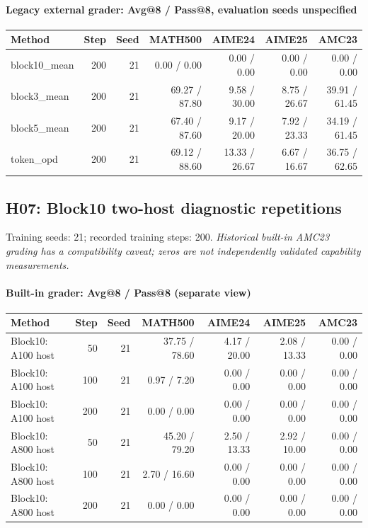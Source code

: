 \paragraph{Legacy external grader: Avg@8 / Pass@8, evaluation seeds unspecified}
{\footnotesize\setlength{\tabcolsep}{3.5pt}
\begin{longtable}{@{}p{1.4in}rrrrrr@{}}
\toprule
Method & Step & Seed & MATH500 & AIME24 & AIME25 & AMC23 \\
\midrule\endhead
block10\_\allowbreak{}mean & 200 & 21 & 0.00 / 0.00 & 0.00 / 0.00 & 0.00 / 0.00 & 0.00 / 0.00 \\
block3\_\allowbreak{}mean & 200 & 21 & 69.27 / 87.80 & 9.58 / 30.00 & 8.75 / 26.67 & 39.91 / 61.45 \\
block5\_\allowbreak{}mean & 200 & 21 & 67.40 / 87.60 & 9.17 / 20.00 & 7.92 / 23.33 & 34.19 / 61.45 \\
token\_\allowbreak{}opd & 200 & 21 & 69.12 / 88.60 & 13.33 / 26.67 & 6.67 / 16.67 & 36.75 / 62.65 \\
\bottomrule\end{longtable}
}
\subsection{H07: Block10 two-host diagnostic repetitions}
\label{history:block10_collapse}
Training seeds: 21; recorded training steps: 200.
\emph{Historical built-in AMC23 grading has a compatibility caveat; zeros are not independently validated capability measurements.}
\paragraph{Built-in grader: Avg@8 / Pass@8 (separate view)}
{\footnotesize\setlength{\tabcolsep}{3.5pt}
\begin{longtable}{@{}p{1.4in}rrrrrr@{}}
\toprule
Method & Step & Seed & MATH500 & AIME24 & AIME25 & AMC23 \\
\midrule\endhead
Block10: A100 host & 50 & 21 & 37.75 / 78.60 & 4.17 / 20.00 & 2.08 / 13.33 & 0.00 / 0.00 \\
Block10: A100 host & 100 & 21 & 0.97 / 7.20 & 0.00 / 0.00 & 0.00 / 0.00 & 0.00 / 0.00 \\
Block10: A100 host & 200 & 21 & 0.00 / 0.00 & 0.00 / 0.00 & 0.00 / 0.00 & 0.00 / 0.00 \\
Block10: A800 host & 50 & 21 & 45.20 / 79.20 & 2.50 / 13.33 & 2.92 / 10.00 & 0.00 / 0.00 \\
Block10: A800 host & 100 & 21 & 2.70 / 16.60 & 0.00 / 0.00 & 0.00 / 0.00 & 0.00 / 0.00 \\
Block10: A800 host & 200 & 21 & 0.00 / 0.00 & 0.00 / 0.00 & 0.00 / 0.00 & 0.00 / 0.00 \\
\bottomrule\end{longtable}
}
